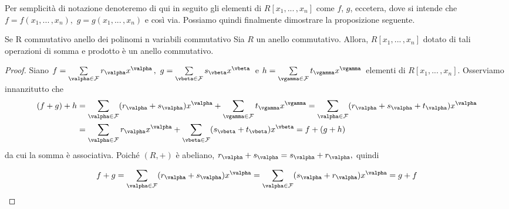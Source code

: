 \clearpage

\noindent Per semplicità di notazione denoteremo di qui in seguito gli elementi di $R[x_1,...\,,x_n]$ come $f$, $g$, eccetera, dove si intende che $f=f(x_1,...\,,x_n),$ $g=g(x_1,...\,,x_n)$ e così via. Possiamo quindi finalmente dimostrare la proposizione seguente.

\begin{prop}[]{Se R commutativo anello dei polinomi n variabili commutativo}
  Sia $R$ un anello commutativo. Allora, $R[x_1,...\,,x_n]$ dotato di tali operazioni di somma e prodotto è un anello commutativo.
\end{prop}
\vspace{-3mm}
\begin{proof}
  Siano $f=\sum\limits_{\valpha\in \mathcal{F}} r_{\valpha}x^{\valpha}\,, \ g=\sum\limits_{\vbeta\in \mathcal{F}} s_{\vbeta}x^{\vbeta}\,$ e 
  $h=\sum\limits_{\vgamma\in \mathcal{F}} t_{\vgamma}x^{\vgamma}\,$ elementi di $R[x_1,...\,,x_n].$ 
  Osserviamo innanzitutto che 
  \begin{align*}\left(f+g\right)+h &= \sum\limits_{\valpha\in \mathcal{F}}(r_{\valpha}+s_{\valpha}) x^{\valpha} + 
    \sum\limits_{\vgamma\in \mathcal{F}} t_{\vgamma}x^{\vgamma} = 
    \sum\limits_{\valpha\in \mathcal{F}}(r_{\valpha}+s_{\valpha}+t_{\valpha}) x^{\valpha} \\ 
    &= \sum\limits_{\valpha\in \mathcal{F}} r_{\valpha}x^{\valpha}+ 
      \sum\limits_{\vbeta\in \mathcal{F}}(s_{\vbeta}+t_{\vbeta}) x^{\vbeta}=f+\left(g+h\right)
  \end{align*} 
  \noindent da cui la somma è associativa. Poiché $(R,+)$ è abeliano, $r_{\valpha}+s_{\valpha}=s_{\valpha}+r_{\valpha},$ quindi

  \[ f+g = \sum\limits_{\valpha\in \mathcal{F}}(r_{\valpha}+s_{\valpha}) x^{\valpha}=
  \sum\limits_{\valpha\in \mathcal{F}}(s_{\valpha}+r_{\valpha}) x^{\valpha}=g+f\] 


\end{proof}
